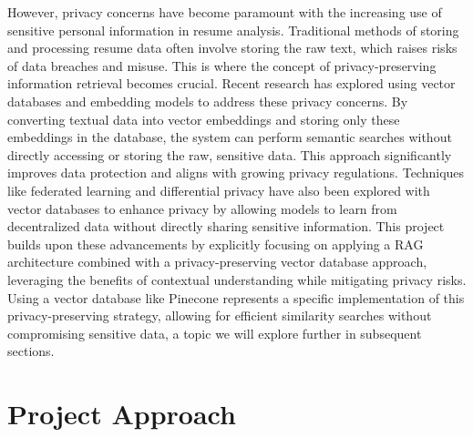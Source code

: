 \documentclass[12pt]{report}
\begin{document}
However, privacy concerns have become paramount with the increasing use of sensitive personal information in resume analysis. Traditional methods of storing and processing resume data often involve storing the raw text, which raises risks of data breaches and misuse. This is where the concept of privacy-preserving information retrieval becomes crucial. Recent research has explored using vector databases and embedding models to address these privacy concerns. \cite{he-2025} By converting textual data into vector embeddings and storing only these embeddings in the database, the system can perform semantic searches without directly accessing or storing the raw, sensitive data. This approach significantly improves data protection and aligns with growing privacy regulations. \cite{boppana-2024} Techniques like federated learning and differential privacy have also been explored with vector databases to enhance privacy by allowing models to learn from decentralized data without directly sharing sensitive information. This project builds upon these advancements by explicitly focusing on applying a RAG architecture combined with a privacy-preserving vector database approach, leveraging the benefits of contextual understanding while mitigating privacy risks. Using a vector database like Pinecone represents a specific implementation of this privacy-preserving strategy, allowing for efficient similarity searches without compromising sensitive data, a topic we will explore further in subsequent sections.


\section{Project Approach}
\end{document}
